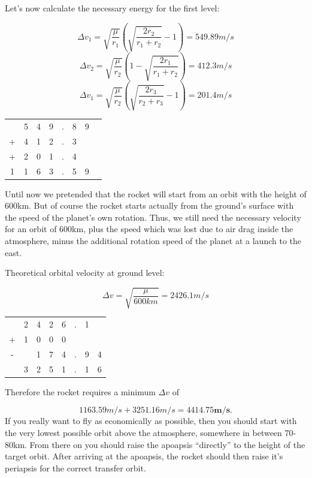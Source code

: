\documentclass[12pt,paper=A4,numbers=noenddot,bibliography=totoc,listof=totoc,DIV=11,BCOR=1mm]{scrreprt}
\begin{document}
Let's now calculate the necessary energy for the first level:

\begin{equation*}
\Delta v_{1} = \sqrt{\frac{\mu}{r_{1}}} \left( \sqrt{\frac{2r_{2}}{r_{1}+r_{2}}}-1 \right)
             = 549.89 m/s
\end{equation*}
\begin{equation*}
\Delta v_{2} = \sqrt{\frac{\mu}{r_{2}}} \left( 1-\sqrt{\frac{2r_{1}}{r_{1}+r_{2}}} \right)
             = 412.3 m/s
\end{equation*}
\begin{equation*}
\Delta v_{1} = \sqrt{\frac{\mu}{r_{2}}} \left( \sqrt{\frac{2r_{3}}{r_{2}+r_{3}}}-1 \right)
             = 201.4 m/s
\end{equation*}

\begin{flushright}
\begin{tabular}{c@{\,}c@{\,}c@{\,}c@{\,}c@{\,}c@{\,}c@{\,}c}
  & 5 & 4 & 9 & . & 8 & 9 \\ 
+ & 4 & 1 & 2 & . & 3 &   \\ 
+ & 2 & 0 & 1 & . & 4 &   \\ 
\hline 
1 & 1 & 6 & 3 & . & 5 & 9 \\ 
\end{tabular}
\end{flushright}

Until now we pretended that the rocket will start from an orbit with the height of 600km. But of course the rocket starts actually from the ground's surface with the speed of the planet's own rotation.
Thus, we still need the necessary velocity for an orbit of 600km, plus the speed which was lost due to air drag inside the atmosphere, minus the additional rotation speed of the planet at a launch to the east.\\

\begin{flushleft}
Theoretical orbital velocity at ground level:
\end{flushleft}
\begin{equation*}
\Delta v = \sqrt{\frac{\mu}{600km}} = 2426.1 m/s
\end{equation*}
\begin{flushright}
\begin{tabular}{c@{\,}c@{\,}c@{\,}c@{\,}c@{\,}c@{\,}c@{\,}c}
  & 2 & 4 & 2 & 6 & . & 1 &   \\ 
+ & 1 & 0 & 0 & 0 &   &   &   \\ 
- &   & 1 & 7 & 4 & . & 9 & 4 \\ 
\hline 
  & 3 & 2 & 5 & 1 & . & 1 & 6 \\ 
\end{tabular}
\end{flushright}
\hypertarget{kerbinrocketdrag}{Therefore the rocket requires a minimum $\Delta v$ of}
$$
1163.59 m/s + 3251.16 m/s = \mathbf{4414.75 m/s}.
$$
If you really want to fly as economically as possible, then you should start with the very lowest possible orbit above the atmosphere, somewhere in between 70-80km. From there on you should raise the apoapsis ``directly'' to the height of the target orbit. After arriving at the apoapsis, the rocket should then raise it's periapsis for the correct transfer orbit.
\end{document}

